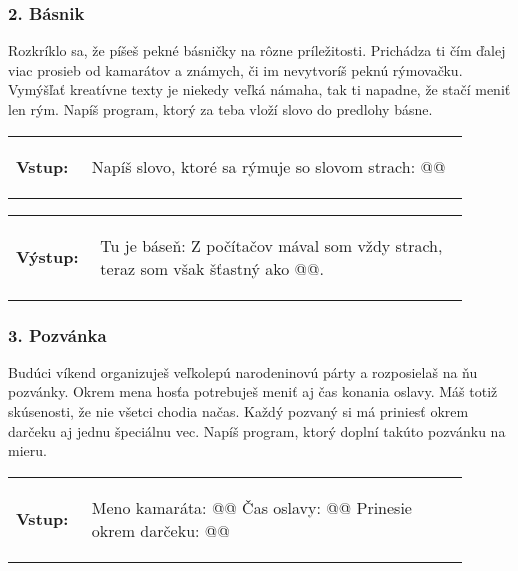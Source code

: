 \subsubsection*{2. Básnik}
Rozkríklo sa, že píšeš pekné básničky na rôzne príležitosti. Prichádza ti čím ďalej viac prosieb od kamarátov a známych, či im nevytvoríš peknú rýmovačku. Vymýšľať kreatívne texty je niekedy veľká námaha, tak ti napadne, že stačí meniť len rým. Napíš program, ktorý za teba vloží slovo do predlohy básne.

\begin{tabular}{@{}p{0.15\linewidth}p{0.75\linewidth}}
\textbf{\small Vstup:} &
\vspace{-3em}
\begin{code}
Napíš slovo, ktoré sa rýmuje so slovom strach: @\fbox{\phantom{slovo}}@
\end{code}
\end{tabular}

\vspace{-2em}
\begin{tabular}{@{}p{0.15\linewidth}p{0.75\linewidth}}
\textbf{\small Výstup:} &
\vspace{-3em}
\begin{code}
Tu je báseň:
Z počítačov mával som vždy strach,
teraz som však šťastný ako @\fbox{\phantom{slovo}}@.
\end{code}
\end{tabular}
\vspace{-2em}

\subsubsection*{3. Pozvánka}
Budúci víkend organizuješ veľkolepú narodeninovú párty a rozposielaš na ňu pozvánky. Okrem mena hosťa potrebuješ meniť aj čas konania oslavy. Máš totiž skúsenosti, že nie všetci chodia načas. Každý pozvaný si má priniesť okrem darčeku aj jednu špeciálnu vec. Napíš program, ktorý doplní takúto pozvánku na mieru.

\begin{tabular}{@{}p{0.15\linewidth}p{0.75\linewidth}}
\textbf{\small Vstup:} &
\vspace{-3em}
\begin{code}
Meno kamaráta: @\fbox{\phantom{vstup}}@
Čas oslavy: @\fbox{\phantom{vstup}}@
Prinesie okrem darčeku: @\fbox{\phantom{vstup}}@
\end{code}
\end{tabular}

